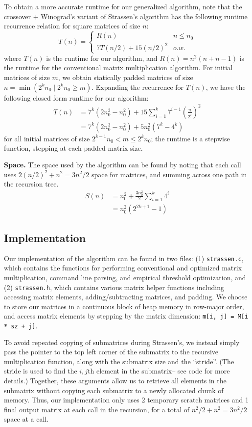 \documentclass[a4paper]{article}
\begin{document}
To obtain a more accurate runtime for our generalized algorithm, note that the crossover + Winograd's variant of Strassen's algorithm has the following runtime recurrence relation for square matrices of size $n$:
\[ 
T(n) = 
\begin{cases} 
R(n) & n\leq n_0 \\
7T(n/2) + 15(n/2)^2 & o.w.
\end{cases}
\]
where $T(n)$ is the runtime for our algorithm, and $R(n) = n^2(n + n-1)$ is the runtime for the conventional matrix multiplication algorithm. For initial matrices of size $m$, we obtain statically padded matrices of size $n = \min(2^kn_0\mid2^kn_0\geq m)$. Expanding the recurrence for $T(n)$, we have the following closed form runtime for our algorithm:
\begin{align*}
T(n) &= 7^k(2n_0^3 - n_0^2) + 15\sum_{i=1}^k 7^{i-1}\left(\frac{n}{2^i}\right)^2 \\
&= 7^k(2n_0^3 - n_0^2) + 5 n_0^2(7^k - 4^k)
\end{align*}
for all initial matrices of size $2^{k-1}n_0 < m \leq 2^k n_0$; the runtime is a stepwise function, stepping at each padded matrix size.

\textbf{Space. } The space used by the algorithm can be found by noting that each call uses $2(n/2)^2 + n^2 = 3n^2/2$ space for matrices, and summing across one path in the recursion tree.
\begin{align*}
S(n) &= n_0^2 + \frac{3n_0^2}{2}\sum_{i=1}^k 4^i \\
&= n_0^2(2^{2k+1} - 1)
\end{align*}



\subsection{Implementation}
Our implementation of the algorithm can be found in two files: (1) \texttt{strassen.c}, which contains the functions for performing conventional and optimized matrix multiplication, command line parsing, and empirical threshold optimization, and (2) \texttt{strassen.h}, which contains various matrix helper functions including accessing matrix elements, adding/subtracting matrices, and padding. We choose to store our matrices in a continuous block of heap memory in row-major order, and access matrix elements by stepping by the matrix dimension: \texttt{m[i, j] = M[i * sz + j]}. 

To avoid repeated copying of submatrices during Strassen's, we instead simply pass the pointer to the top left corner of the submatrix to the recursive multiplication function, along with the submatrix size and the ``stride''. (The stride is used to find the $i,j$th element in the submatrix-- see code for more details.) Together, these arguments allow us to retrieve all elements in the submatrix without copying each submatrix to a newly allocated chunk of memory. Thus, our implementation only uses 2 temporary scratch matrices and 1 final output matrix at each call in the recursion, for a total of $n^2/2 + n^2 = 3n^2/2$ space at a call.
\end{document}
